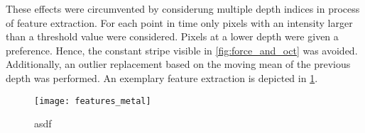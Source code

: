 These effects were circumvented by considerung multiple depth indices in process of feature extraction.
For each point in time only pixels with an intensity larger than a threshold value were considered.
Pixels at a lower depth were given a preference.
Hence, the constant stripe visible in \cref{fig:force_and_oct} was avoided.
Additionally, an outlier replacement based on the moving mean of the previous depth was performed.
An exemplary feature extraction is depicted in \cref{fig:features_metal}.

\begin{figure}
    \centering
    \texttt{[image: features\_metal]}
    \caption{asdf}
    \label{fig:features_metal}
\end{figure}
